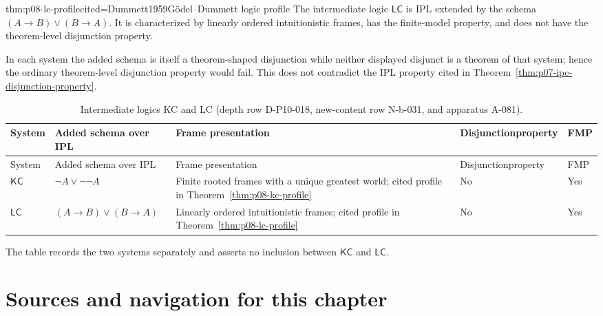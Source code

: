 \begin{hbtheorem}{thm:p08-lc-profile}{cited=Dummett1959}{G\"odel--Dummett logic profile}
The intermediate logic \(\mathsf{LC}\) is IPL extended by the schema
\((A\to B)\lor(B\to A)\).  It is characterized by linearly ordered
intuitionistic frames, has the finite-model property, and does not have the
theorem-level disjunction property.
\end{hbtheorem}

In each system the added schema is itself a theorem-shaped disjunction while
neither displayed disjunct is a theorem of that system; hence the ordinary
theorem-level disjunction property would fail.  This does not contradict the
IPL property cited in Theorem~\ref{thm:p07-ipc-disjunction-property}.

\begingroup\scriptsize
\begin{longtable}{@{}p{}p{}p{}p{}p{}@{}}
\caption{Intermediate logics KC and LC (depth row D-P10-018,
new-content row N-b-031, and apparatus A-081).}
\label{tab:p08-intermediate-logics}\\
\toprule
System & Added schema over IPL & Frame presentation & Disjunction\newline property & FMP \\
\midrule
\endfirsthead
\toprule
System & Added schema over IPL & Frame presentation & Disjunction\newline property & FMP \\
\midrule
\endhead
\(\mathsf{KC}\) & \(\neg A\lor\neg\neg A\) & Finite rooted frames with a
unique greatest world; cited profile in
Theorem~\ref{thm:p08-kc-profile} & No & Yes \\
\(\mathsf{LC}\) & \((A\to B)\lor(B\to A)\) & Linearly ordered
intuitionistic frames; cited profile in
Theorem~\ref{thm:p08-lc-profile} & No & Yes \\
\bottomrule
\end{longtable}
\endgroup

The table records the two systems separately and asserts no inclusion between
\(\mathsf{KC}\) and \(\mathsf{LC}\).


\section{Sources and navigation for this chapter}

